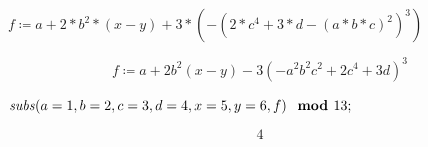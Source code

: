 \begin{Maple Normal}
{$ \displaystyle f \coloneqq a +2*b ^{2}*(x -y)+3*(-(2*c ^{4}+3*d -(a *b *c)^{2})^{3}) $}
\end{Maple Normal}
\begin{dmath}\label{(1)}
f \coloneqq a +2 b^{2} \left(x -y \right)-3 \left(-a^{2} b^{2} c^{2}+2 c^{4}+3 d \right)^{3}
\end{dmath}
\begin{Maple Normal}
{$ \displaystyle \mathit{subs} (a =1,b =2,c =3,d =4,x =5,y =6,f)\boldsymbol{\mod}13; $}
\end{Maple Normal}
\begin{dmath}\label{(2)}
4
\end{dmath}
